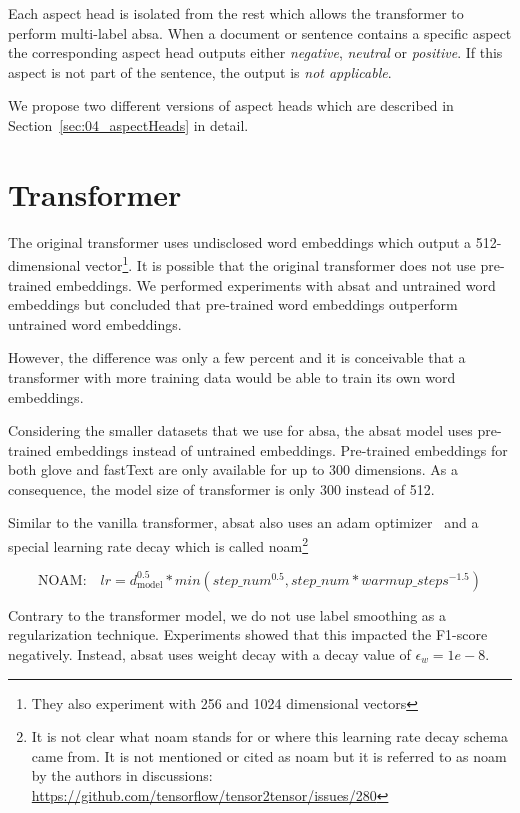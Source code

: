 Each aspect head is isolated from the rest which allows the transformer to perform multi-label \gls{absa}. When a document or sentence contains a specific aspect the corresponding aspect head outputs either \textit{negative}, \textit{neutral} or \textit{positive}. If this aspect is not part of the sentence, the output is \textit{not applicable}.

We propose two different versions of aspect heads which are described in Section~\ref{sec:04_aspectHeads} in detail.

\section{Transformer}
\label{sec:04_transformer}

The original transformer uses undisclosed word embeddings which output a 512-dimensional vector\footnote{They also experiment with 256 and 1024 dimensional vectors}. It is possible that the original transformer does not use pre-trained embeddings. We performed experiments with \gls{absat} and untrained word embeddings but concluded that pre-trained word embeddings outperform untrained word embeddings. 

However, the difference was only a few percent and it is conceivable that a transformer with more training data would be able to train its own word embeddings.
\medskip

Considering the smaller datasets that we use for \gls{absa}, the \gls{absat} model uses pre-trained embeddings instead of untrained embeddings. Pre-trained embeddings for both \gls{glove} and fastText are only available for up to 300 dimensions. As a consequence, the model size of transformer is only 300 instead of 512.
\bigskip

Similar to the vanilla transformer, \gls{absat} also uses an \gls{adam} optimizer~\cite{Kingma2014} and a special learning rate decay which is called noam\footnote{It is not clear what noam stands for or where this learning rate decay schema came from. It is not mentioned or cited as noam but it is referred to as noam by the authors in discussions: \url{https://github.com/tensorflow/tensor2tensor/issues/280}}~\cite{Vaswani2017}

\begin{equation}
	\text{NOAM:} \quad lr = d_\text{model}^{0.5} * min(step\_num^{0.5}, step\_num*warmup\_steps^{-1.5})
\end{equation}
 
Contrary to the transformer model, we do not use label smoothing as a regularization technique. Experiments showed that this impacted the F1-score negatively. Instead, \gls{absat} uses weight decay with a decay value of $\epsilon_w = 1e-8$.


